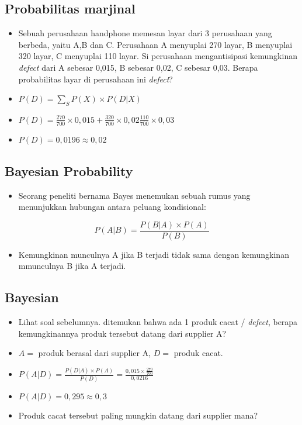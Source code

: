 \documentclass[
  letterpaper,
  DIV=11,
  numbers=noendperiod]{scrartcl}
\providecommand{\tightlist}{%
  \setlength{\itemsep}{0pt}\setlength{\parskip}{0pt}}\usepackage{longtable,booktabs,array}
\begin{document}
\subsection{Probabilitas marjinal}\label{probabilitas-marjinal}

\begin{itemize}
\item
  Sebuah perusahaan handphone memesan layar dari 3 perusahaan yang
  berbeda, yaitu A,B dan C. Perusahaan A menyuplai 270 layar, B
  menyuplai 320 layar, C menyuplai 110 layar. Si perusahaan
  mengantisipasi kemungkinan \emph{defect} dari A sebesar 0,015, B
  sebesar 0,02, C sebesar 0,03. Berapa probabilitas layar di perusahaan
  ini \emph{defect}?
\item
  \(P(D)=\sum_S P(X) \times P(D|X)\)
\item
  \(P(D)=\frac{270}{700} \times 0,015 + \frac{320}{700} \times 0,02 \frac{110}{700} \times 0,03\)
\item
  \(P(D)=0,0196 \approx 0,02\)
\end{itemize}

\subsection{Bayesian Probability}\label{bayesian-probability}

\begin{itemize}
\tightlist
\item
  Seorang peneliti bernama Bayes menemukan sebuah rumus yang menunjukkan
  hubungan antara peluang kondisional:
\end{itemize}

\[
P(A|B)=\frac{P(B|A) \times P(A)}{P(B)}
\]

\begin{itemize}
\tightlist
\item
  Kemungkinan munculnya A jika B terjadi tidak sama dengan kemungkinan
  mmunculnya B jika A terjadi.
\end{itemize}

\subsection{Bayesian}\label{bayesian}

\begin{itemize}
\item
  Lihat soal sebelumnya. ditemukan bahwa ada 1 produk cacat /
  \emph{defect}, berapa kemungkinannya produk tersebut datang dari
  supplier A?
\item
  \(A=\) produk berasal dari supplier A, \(D=\) produk cacat.
\item
  \(P(A|D)=\frac{P(D|A) \times P(A)}{P(D)}=\frac{0,015 \times \frac{270}{700}}{0,0216}\)
\item
  \(P(A|D)=0,295 \approx 0,3\)
\item
  Produk cacat tersebut paling mungkin datang dari supplier mana?
\end{itemize}
\end{document}
